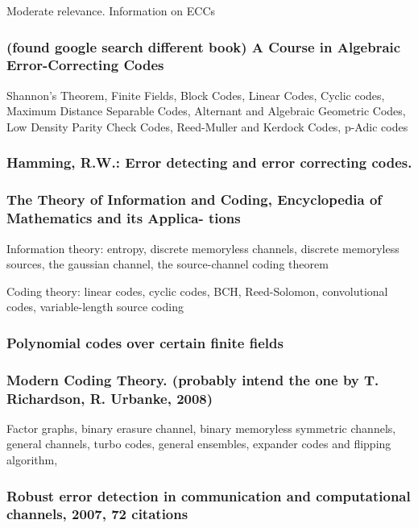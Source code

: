 \documentclass{article}
\begin{document}
Moderate relevance. Information on ECCs

\subsubsection{(found google search different book) A Course in Algebraic Error-Correcting Codes}

Shannon's Theorem, Finite Fields, Block Codes, Linear Codes, Cyclic codes, Maximum Distance Separable Codes, Alternant and Algebraic Geometric Codes, Low Density Parity Check Codes, Reed-Muller and Kerdock Codes, p-Adic codes

\subsubsection{Hamming, R.W.: Error detecting and error correcting codes.}

\subsubsection{The Theory of Information and Coding, Encyclopedia of Mathematics and its Applica-
tions}

Information theory: entropy, discrete memoryless channels, discrete memoryless sources, the gaussian channel, the source-channel coding theorem

Coding theory: linear codes, cyclic codes, BCH, Reed-Solomon, convolutional codes, variable-length source coding

\subsubsection{Polynomial codes over certain finite fields}

\subsubsection{Modern Coding Theory. (probably intend the one by T. Richardson, R. Urbanke, 2008)}

Factor graphs, binary erasure channel, binary memoryless symmetric channels, general channels, turbo codes, general ensembles, expander codes and flipping algorithm,

\subsubsection{Robust error detection in communication and computational channels, 2007, 72 citations}
\end{document}
